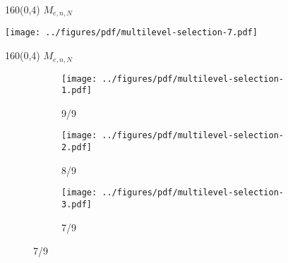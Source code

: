 \documentclass[shownotes,aspectratio=169]{beamer}
\newif\ifen
\newif\ifes
\newcommand{\en}[1]{\ifen#1\fi}
\newcommand{\es}[1]{\ifes#1\fi}
\begin{document}
\begin{frame}[plain]
\begin{textblock}{160}(0,4)
 \centering \LARGE
\en{Fitness for mixed populations} $M_{e,n,N}$
\end{textblock}
\vspace{1.3cm} \centering

\texttt{[image: ../figures/pdf/multilevel-selection-7.pdf]}

\end{frame}


\begin{frame}[plain]
\begin{textblock}{160}(0,4)
 \centering \LARGE
\en{Fitness for mixed populations} $M_{e,n,N}$
\end{textblock}
\vspace{1.3cm} \centering


\begin{figure}[H]
    \centering
    \begin{subfigure}[b]{0.32\textwidth}
    \texttt{[image: ../figures/pdf/multilevel-selection-1.pdf]}
    \caption{9/9}
    \label{fig:multilevel-selection-1}
    \end{subfigure}
    \begin{subfigure}[b]{0.32\textwidth}
    \texttt{[image: ../figures/pdf/multilevel-selection-2.pdf]}
    \caption{8/9}
    \label{fig:multilevel-selection-2}
    \end{subfigure}
    \begin{subfigure}[b]{0.32\textwidth}
    \texttt{[image: ../figures/pdf/multilevel-selection-3.pdf]}
    \caption{7/9}
    \label{fig:multilevel-selection-3}
    \end{subfigure}
\end{figure}
%

\end{frame}
\end{document}
